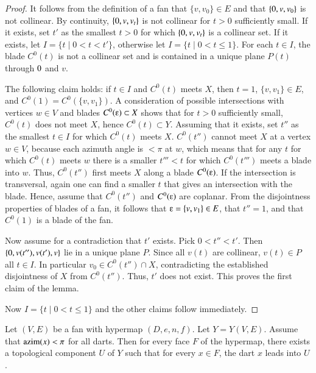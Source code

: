 \begin{proof}
It follows from the definition of a fan that $\{v,v_0\}\in E$ and
that $\{0,v,v_0\}$ is not collinear.  By continuity, $\{0,v,v_t\}$
is not collinear for $t>0$ sufficiently small.  If it exists, set $t'$ as
the smallest $t>0$ for which $\{0,v,v_t\}$ is a collinear set.  If it exists, let $I=\{t\mid 0< t < t'\}$, otherwise let $I=\{t\mid 0 < t \le 1\}$.  For each $t\in I$, the blade $C^0(t)$ is not a collinear set and is contained in a unique plane $P(t)$ through $0$ and $v$.

The following claim holds: if $t\in I$ and $C^0(t)$ meets $X$, then $t=1$, $\{v,v_1\}\in E$, and $C^0(1)= C^0(\{v,v_1\})$.  A consideration of possible intersections with vertices $w\in V$ and blades
$C^0(\e)\subset X$ shows that for $t>0$ sufficiently small,
$C^0(t)$ does not meet $X$, hence $C^0(t)\subset Y$.  Assuming 
that it exists, set $t''$
as the smallest $t\in I$ for which $C^0(t)$ meets $X$.   
$C^0(t'')$ cannot meet $X$ at a vertex $w\in V$, because each azimuth angle
is $<\pi$ at $w$, which means that for any $t$ for which  $C^0(t)$ meets $w$ 
there is a smaller $t'''<t$ for which $C^0(t''')$ meets a blade into $w$.
Thus, $C^0(t'')$ first meets $X$ along a blade $C^0(\e)$. If
the intersection is transversal, again one can find a smaller $t$ that
gives an intersection with the blade.  Hence, assume that
$C^0(t'')$ and $C^0(\e)$ are coplanar.  From the disjointness
properties of blades of a fan, it follows that $\e = \{v,v_1\}\in E$,
that $t''=1$, and that $C^0(1)$ is a blade of the fan.

Now assume for a contradiction that $t'$ exists.  Pick $0<t''<t'$.  Then
$\{0,v(t''),v(t'),v\}$ lie in a unique plane $P$.  Since all $v(t)$
are collinear,  $v(t)\in P$ all $t\in I$.  In particular $v_0\in C^0(t'')\cap X$,
contradicting the established disjointness of $X$ from $C^0(t'')$.  Thus, $t'$ does not exist.  This proves the first
claim of the lemma.  

Now $I= \{t\mid 0 < t \le 1\}$ and the other claims follow immediately.
\end{proof}

\begin{lemma} 
Let $(V,E)$ be a fan with hypermap $(D,e,n,f)$. Let $Y=Y(V,E)$. Assume that ${\operatorname{azim}}(x)<\pi$ for all darts. Then for every face $F$ of the hypermap, there exists a topological component $U$ of $Y$ such that for every $x\in F$, the dart $x$ leads into $U$. 
\end{lemma}


